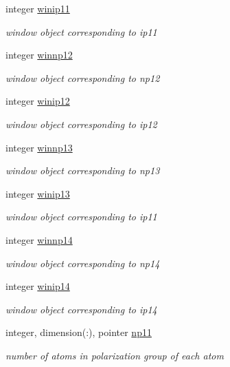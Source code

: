 \begin{DoxyCompactItemize}
integer \hyperlink{classpolgrp_ab6396614f84e93532e2c725526d2620b}{winip11}
\begin{DoxyCompactList}\small\item\em window object corresponding to ip11 \end{DoxyCompactList}\item 
integer \hyperlink{classpolgrp_a37cb2c122436bd12b40dc41522d0ca6b}{winnp12}
\begin{DoxyCompactList}\small\item\em window object corresponding to np12 \end{DoxyCompactList}\item 
integer \hyperlink{classpolgrp_a632031755a8a35eb397f2ca01469c9c2}{winip12}
\begin{DoxyCompactList}\small\item\em window object corresponding to ip12 \end{DoxyCompactList}\item 
integer \hyperlink{classpolgrp_a5f1f4493530a9bbfe87e67c1eedf6e06}{winnp13}
\begin{DoxyCompactList}\small\item\em window object corresponding to np13 \end{DoxyCompactList}\item 
integer \hyperlink{classpolgrp_a335848d07bb9d569d26707648ede83e1}{winip13}
\begin{DoxyCompactList}\small\item\em window object corresponding to ip11 \end{DoxyCompactList}\item 
integer \hyperlink{classpolgrp_ac8105e0df2c1da60cad892c39387eabd}{winnp14}
\begin{DoxyCompactList}\small\item\em window object corresponding to np14 \end{DoxyCompactList}\item 
integer \hyperlink{classpolgrp_a809358dbcbadb21641441612c9ab8672}{winip14}
\begin{DoxyCompactList}\small\item\em window object corresponding to ip14 \end{DoxyCompactList}\item 
integer, dimension(\-:), pointer \hyperlink{classpolgrp_a92496ef9d82dc1881a591033a76c032f}{np11}
\begin{DoxyCompactList}\small\item\em number of atoms in polarization group of each atom \end{DoxyCompactList}\item 

\end{DoxyCompactItemize}
